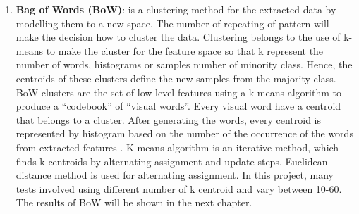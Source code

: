 \begin{enumerate}
\item \textbf{Bag of Words (BoW)}: is a clustering method for the extracted data by modelling them to a new space.
The number of repeating of pattern will make the decision how to cluster the data.
Clustering belongs to the use of k-means to make the cluster for the feature space so that k represent the number of words, histograms or samples number of minority class.
Hence, the centroids of these clusters define the new samples from the majority class.
BoW clusters are the set of low-level features using a k-means algorithm to produce a “codebook” of “visual words”.
Every visual word have a centroid that belongs to a cluster.
After generating the words, every centroid is represented by histogram based on the number of the occurrence of the words from extracted features \cite{sun2012automatic}.
K-means algorithm is an iterative method, which finds k centroids by alternating assignment and update steps.
Euclidean distance method is used for alternating assignment.
In this project, many tests involved using different number of k centroid and vary between 10-60.
The results of BoW will be shown in the next chapter.
\end{enumerate}

